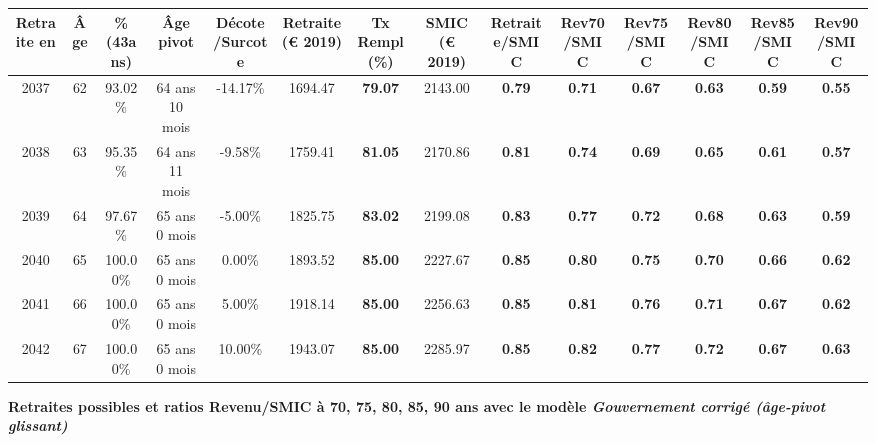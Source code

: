 \begin{adjustbox}{max width=\textwidth} 
\begin{tabular}[htb]{|c|c||c|c|c||c|c||c||c|c|c|c|c|c|} 
\hline 
 Retraite en &  Âge &  \%(43ans) &  Âge pivot &  Décote/Surcote &  Retraite (\euro{} 2019) &  Tx Rempl(\%) &  SMIC (\euro{} 2019) &  Retraite/SMIC &  Rev70/SMIC &  Rev75/SMIC &  Rev80/SMIC &  Rev85/SMIC &  Rev90/SMIC \\ 
\hline \hline 
 2037 &  62 &  93.02\% &  64 ans 10 mois &  -14.17\% &  1694.47 &  {\bf 79.07} &  2143.00 &  {\bf {\color{red} 0.79}} &  {\bf {\color{red} 0.71}} &  {\bf {\color{red} 0.67}} &  {\bf {\color{red} 0.63}} &  {\bf {\color{red} 0.59}} &  {\bf {\color{red} 0.55}} \\ 
\hline 
 2038 &  63 &  95.35\% &  64 ans 11 mois &  -9.58\% &  1759.41 &  {\bf 81.05} &  2170.86 &  {\bf {\color{red} 0.81}} &  {\bf {\color{red} 0.74}} &  {\bf {\color{red} 0.69}} &  {\bf {\color{red} 0.65}} &  {\bf {\color{red} 0.61}} &  {\bf {\color{red} 0.57}} \\ 
\hline 
 2039 &  64 &  97.67\% &  65 ans 0 mois &  -5.00\% &  1825.75 &  {\bf 83.02} &  2199.08 &  {\bf {\color{red} 0.83}} &  {\bf {\color{red} 0.77}} &  {\bf {\color{red} 0.72}} &  {\bf {\color{red} 0.68}} &  {\bf {\color{red} 0.63}} &  {\bf {\color{red} 0.59}} \\ 
\hline 
 2040 &  65 &  100.00\% &  65 ans 0 mois &  0.00\% &  1893.52 &  {\bf 85.00} &  2227.67 &  {\bf {\color{red} 0.85}} &  {\bf {\color{red} 0.80}} &  {\bf {\color{red} 0.75}} &  {\bf {\color{red} 0.70}} &  {\bf {\color{red} 0.66}} &  {\bf {\color{red} 0.62}} \\ 
\hline 
 2041 &  66 &  100.00\% &  65 ans 0 mois &  5.00\% &  1918.14 &  {\bf 85.00} &  2256.63 &  {\bf {\color{red} 0.85}} &  {\bf {\color{red} 0.81}} &  {\bf {\color{red} 0.76}} &  {\bf {\color{red} 0.71}} &  {\bf {\color{red} 0.67}} &  {\bf {\color{red} 0.62}} \\ 
\hline 
 2042 &  67 &  100.00\% &  65 ans 0 mois &  10.00\% &  1943.07 &  {\bf 85.00} &  2285.97 &  {\bf {\color{red} 0.85}} &  {\bf {\color{red} 0.82}} &  {\bf {\color{red} 0.77}} &  {\bf {\color{red} 0.72}} &  {\bf {\color{red} 0.67}} &  {\bf {\color{red} 0.63}} \\ 
\hline 
\hline 
\end{tabular} 
\end{adjustbox} 
 
 \vspace{0.1cm} 
{\bf \noindent Retraites possibles et ratios Revenu/SMIC à 70, 75, 80, 85, 90 ans avec le modèle \emph{Gouvernement corrigé (âge-pivot glissant)}}  
 
